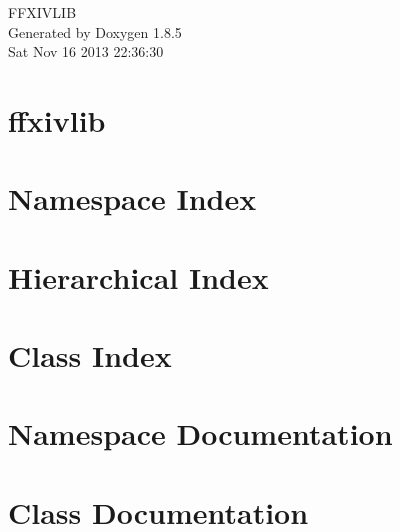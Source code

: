 \documentclass[twoside]{book}
\newcommand{\clearemptydoublepage}{%
  \newpage{\pagestyle{empty}\cleardoublepage}%
}
\begin{document}
\hypersetup{pageanchor=false}
\begin{titlepage}
\vspace*{7cm}
\begin{center}%
{\Large F\-F\-X\-I\-V\-L\-I\-B }\\
\vspace*{1cm}
{\large Generated by Doxygen 1.8.5}\\
\vspace*{0.5cm}
{\small Sat Nov 16 2013 22:36:30}\\
\end{center}
\end{titlepage}
\clearemptydoublepage
\tableofcontents
\clearemptydoublepage
{}
\hypersetup{pageanchor=true}

\chapter{ffxivlib}
\label{md__r_e_a_d_m_e}
\hypertarget{md__r_e_a_d_m_e}{}

\chapter{Namespace Index}

\chapter{Hierarchical Index}

\chapter{Class Index}

\chapter{Namespace Documentation}

\chapter{Class Documentation}























\newpage
{}
{}
\printindex
\end{document}
